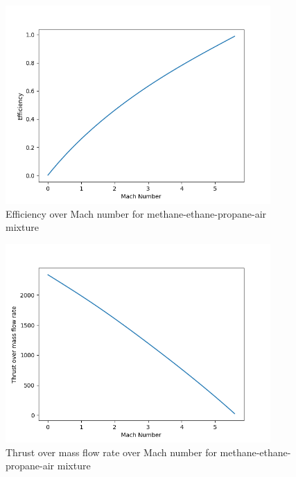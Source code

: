 \documentclass[a4paper,11pt]{article}
\begin{document}
	\begin{figure}[H]
		\centering
		\includegraphics[width=0.9\textwidth]{Metan(1mol)_etan(0.4mol)_propan(0.2mol)_pow/Efficiency_over_Mach.png}
       		\caption{Efficiency over Mach number for methane-ethane-propane-air mixture}
	\end{figure}
	\begin{figure}[H]
		\centering
		\includegraphics[width=0.9\textwidth]{Metan(1mol)_etan(0.4mol)_propan(0.2mol)_pow/Thrust_over_mass_flow_rate_over_Mach.png}
       		\caption{Thrust over mass flow rate over Mach number for methane-ethane-propane-air mixture}
	\end{figure}
\end{document}
